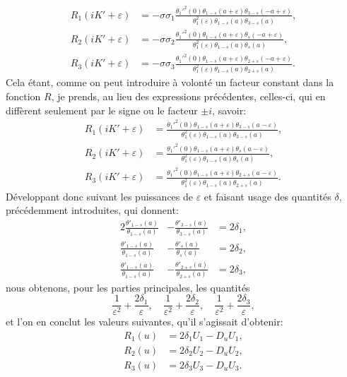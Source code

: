 \documentclass[11pt,leqno,oneside,letterpaper]{book}[2005/09/16]
\begin{document}
\begin{align*}
R_1(iK'+\varepsilon) &= -\sigma\sigma_1
\frac{ \theta_1'^2(0)
       \theta_{1-s}( a+\varepsilon)
       \theta_{3-s}(-a+\varepsilon) }{
       \theta_1^2(\varepsilon)
       \theta_{1-s}(a)
       \theta_{3-s}(a) },
\\
R_2(iK'+\varepsilon) &= -\sigma\sigma_2
\frac{ \theta_1'^2(0)
       \theta_{1-s}( a+\varepsilon)
       \theta_{  s}(-a+\varepsilon) }{
       \theta_1^2(\varepsilon)
       \theta_{1-s}(a)
       \theta_{  s}(a) },
\\
R_3(iK'+\varepsilon) &= -\sigma\sigma_3
\frac{ \theta_1'^2(0)
       \theta_{1-s}( a+\varepsilon)
       \theta_{2+s}(-a+\varepsilon) }{
       \theta_1^2(\varepsilon)
       \theta_{1-s}(a)
       \theta_{2+s}(a) }.
\end{align*}
Cela \'etant, comme on peut introduire \`a volont\'e un facteur constant dans
la fonction $R$, je prends, au lieu des expressions pr\'ec\'edentes, celles-ci, qui
en diff\`erent seulement par le signe ou le facteur $\pm i$, savoir:
\begin{align*}
R_1(iK'+\varepsilon) &=
\frac{ \theta_1'^2(0)
          \theta_{1-s}( a+\varepsilon)
          \theta_{3-s}( a-\varepsilon) }{
          \theta_1^2(\varepsilon)
          \theta_{1-s}(a)
          \theta_{3-s}(a) },
\\
R_2(iK'+\varepsilon) &=
\frac{ \theta_1'^2(0)
       \theta_{1-s}( a+\varepsilon)
       \theta_{  s}( a-\varepsilon) }{
       \theta_1^2(\varepsilon)
       \theta_{1-s}(a)
       \theta_{  s}(a) },
\\
R_3(iK'+\varepsilon) &=
\frac{ \theta_1'^2(0)
       \theta_{1-s}( a+\varepsilon)
       \theta_{2+s}( a-\varepsilon) }{
       \theta_1^2(\varepsilon)
       \theta_{1-s}(a)
       \theta_{2+s}(a) }.
\end{align*}
D\'eveloppant donc suivant les puissances de $\varepsilon$ et faisant usage des quantit\'es
$\delta$, pr\'ec\'edemment introduites, qui donnent:
\begin{alignat*}{2}
\frac{\theta'_{1-s}(a)}{\theta_{1-s}(a)}
&- \frac{\theta'_{3-s}(a)}{\theta_{3-s}(a)} &= 2\delta_1 ,
\\
\frac{\theta'_{1-s}(a)}{\theta_{1-s}(a)}
&- \frac{\theta'_{  s}(a)}{\theta_{  s}(a)} &= 2\delta_2 ,
\\
\frac{\theta'_{1-s}(a)}{\theta_{1-s}(a)}
&- \frac{\theta'_{2+s}(a)}{\theta_{2+s}(a)} &= 2\delta_3 ,
\end{alignat*}
nous obtenons, pour les parties principales, les quantit\'es
\[
\frac{1}{\varepsilon^2} + \frac{2\delta_1}{\varepsilon}, \quad
\frac{1}{\varepsilon^2} + \frac{2\delta_2}{\varepsilon}, \quad
\frac{1}{\varepsilon^2} + \frac{2\delta_3}{\varepsilon},
\]
et l'on en conclut les valeurs suivantes, qu'il s'agissait d'obtenir:
\begin{align*}
R_1(u) &= 2\delta_1 U_1 - D_u U_1 , \\
R_2(u) &= 2\delta_2 U_2 - D_u U_2 , \\
R_3(u) &= 2\delta_3 U_3 - D_u U_3 .
\end{align*}
\end{document}

